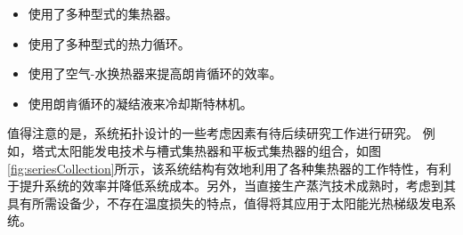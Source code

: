 \begin{itemize}
  \item 使用了多种型式的集热器。
  \item 使用了多种型式的热力循环。
  \item 使用了空气-水换热器来提高朗肯循环的效率。
  \item 使用朗肯循环的凝结液来冷却斯特林机。
\end{itemize}

值得注意的是，系统拓扑设计的一些考虑因素有待后续研究工作进行研究。 例如，塔式太阳能发电技术与槽式集热器和平板式集热器的组合，如图\ref{fig:seriesCollection}所示，该系统结构有效地利用了各种集热器的工作特性，有利于提升系统的效率并降低系统成本。另外，当直接生产蒸汽技术成熟时，考虑到其具有所需设备少，不存在温度损失的特点，值得将其应用于太阳能光热梯级发电系统。